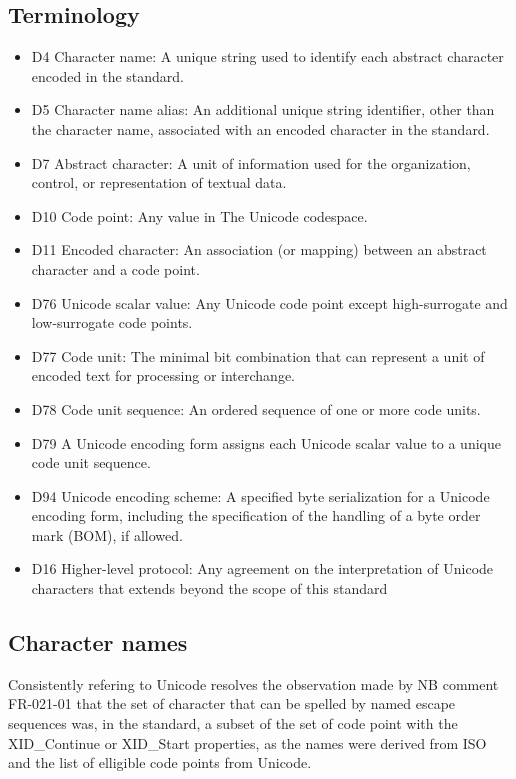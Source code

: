 \documentclass{wg21}
\begin{document}
\subsection{Terminology}
\begin{itemize}
\item D4 Character name: A unique string used to identify each abstract character encoded in
the standard.
\item D5 Character name alias: An additional unique string identifier, other than the character name, associated with an encoded character in the standard.
\item D7 Abstract character: A unit of information used for the organization, control, or representation of textual data.
\item D10 Code point: Any value in The Unicode codespace.
\item D11 Encoded character: An association (or mapping) between an abstract character and
a code point.
\item D76 Unicode scalar value: Any Unicode code point except high-surrogate and low-surrogate code points.
\item D77 Code unit: The minimal bit combination that can represent a unit of encoded text for processing or interchange.
\item D78 Code unit sequence: An ordered sequence of one or more code units.
\item D79 A Unicode encoding form assigns each Unicode scalar value to a unique code unit sequence.
\item D94 Unicode encoding scheme: A specified byte serialization for a Unicode encoding
form, including the specification of the handling of a byte order mark (BOM), if
allowed.
\item D16 Higher-level protocol: Any agreement on the interpretation of Unicode characters
that extends beyond the scope of this standard
\end{itemize}

\subsection{Character names}

Consistently refering to Unicode resolves the observation made by NB comment FR-021-01
that the set of character that can be spelled by named escape sequences  was, in the standard,
a subset of the set of code point with the XID_Continue or XID_Start properties, as the names were derived from ISO
and the list of elligible code points from Unicode.
\end{document}
